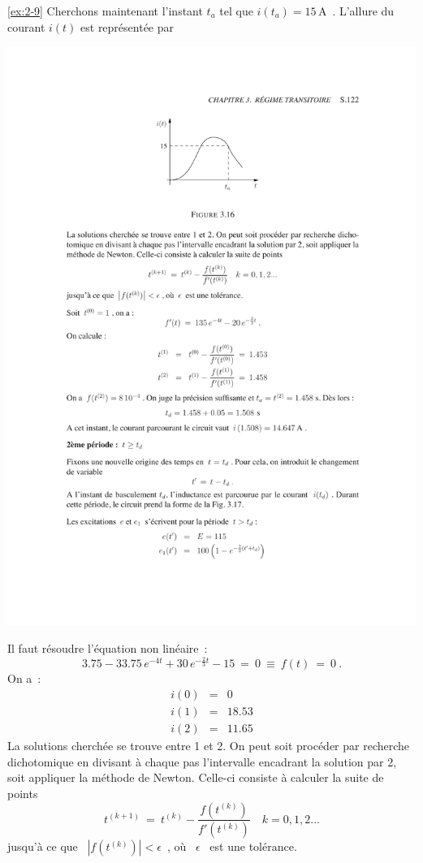 \begin{solexercise}{\ref{ex:2-9}}
Cherchons maintenant l'instant $t_a$ tel que $i(t_a) =
15\,$A~. L'allure du courant $i(t)$ est repr\'esent\'ee par
\begin{center}
	\includegraphics[width=\linewidth]{sol_exercices/ex3-9-2}
\end{center}
Il faut r\'esoudre l'\'equation non lin\'eaire~:
\[ 3.75 - 33.75 \, e^{-4t} + 30 \, e^{-\frac{2}{3}t} - 15 \: = \: 0 \: \equiv \ f(t) \: = \: 0~. \]
On a~:
\begin{eqnarray*}
	i(0) &=&0\\
	i(1) &=& 18.53\\
	i(2) &=& 11.65
\end{eqnarray*}
La solutions cherch\'ee se trouve entre 1 et 2.  On peut soit proc\'eder
par recherche dichotomique en divisant \`a chaque pas l'intervalle
encadrant la solution par 2, soit appliquer la m\'ethode de
Newton. Celle-ci consiste \`a calculer la suite de points
\[ t^{(k+1)} \: = \: t^{(k)} - \frac{f(t^{(k)})}{f'(t^{(k)})} \quad k = 0,1,2... \]
jusqu'\`a ce que \ $\left| f(t^{(k)})\right| < \epsilon$~, o\`u \ $\epsilon$ \ est une tol\'erance.


\end{solexercise}

